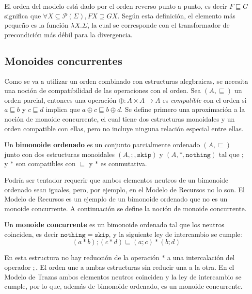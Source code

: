 El orden del modelo está dado por el orden reverso punto a punto, es decir $F \sqsubseteq G$ significa que $\forall X \subseteq \mathcal{P}(\Sigma), FX \supseteq GX$. Según esta definición, el elemento más pequeño es la función $\lambda X.\Sigma$, la cual se corresponde con el transformador de precondición más débil para la divergencia. 

\subsection{Monoides concurrentes}\label{mc:monoid}

Como se va a utilizar un orden combinado con estructuras alegbraicas, se necesita una noción de compatibilidad de las operaciones con el orden.
Sea $(A, \sqsubseteq)$ un orden parcial, entonces una operación $\oplus : A \times A \rightarrow A$ es \textit{compatible} con el orden si $a \sqsubseteq b$ y $c \sqsubseteq d$ implica que $a \oplus c \sqsubseteq b \oplus d$. 
Se define primero una aproximación a la noción de monoide concurrente, el cual tiene dos estructuras monoidales y un orden compatible con ellas, pero no incluye ninguna relación especial entre ellas.  

\begin{definition}\label{def:bimonord}
Un \textbf{bimonoide ordenado} es un conjunto parcialmente ordenado $(A,\sqsubseteq)$ junto con dos estructuras monoidales $(A,;,\mathtt{skip})$ y $(A,*,\mathtt{nothing})$ tal que $;$ y $*$ son compatibles con $\sqsubseteq$ y $*$ es conmutativa.
\end{definition}

Podría ser tentador requerir que ambos elementos neutros de un bimonoide ordenado sean iguales, pero, por ejemplo, en el Modelo de Recursos no lo son. El Modelo de Recursos es un ejemplo de un bimonoide ordenado que no es un monoide concurrente. A continuación se define la noción de monoide concurrente.

\begin{definition}\label{def:monoidconc}
Un \textbf{monoide concurrente} es un bimonoide ordenado tal que los neutros coinciden, es decir $\mathtt{nothing} = \mathtt{skip}$, y la siguiente ley de intercambio se cumple:
\begin{equation*}
(a * b) ; (c * d) \sqsubseteq (a ; c) * (b ; d)
\end{equation*}
\end{definition}

En esta estructura no hay reducción de la operación $*$ a una intercalación del operador $;$. El orden une a ambas estructuras sin reducir una a la otra. En el Modelo de Trazas ambos elementos neutros coinciden y la ley de intercambio se cumple, por lo que, además de bimonoide ordenado, es un monoide concurrente. 



